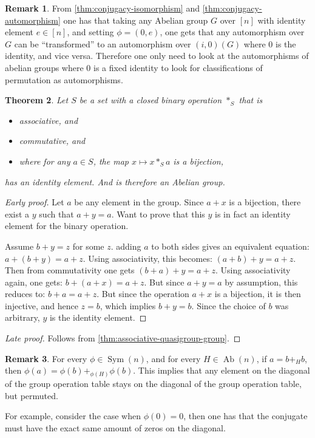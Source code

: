 \documentclass[a4paper, 12pt, english]{article}
\theoremstyle{plain}
\newtheorem{theorem}{Theorem}[section]
\theoremstyle{definition}
\newtheorem{remark}[theorem]{Remark}
\DeclareMathOperator{\Ab}{Ab}
\DeclareMathOperator{\Sym}{Sym}
\begin{document}
\begin{remark}
    From \autoref{thm:conjugacy-isomorphism} and \autoref{thm:conjugacy-automorphism} one has that taking any Abelian group \( G \) over \( [n] \) with identity element \( e \in [n] \), and setting \( \phi = (0, e) \), one gets that any automorphism over \( G \) can be ``transformed'' to an automorphism over \( (i, 0)(G) \) where \( 0 \) is the identity, and vice versa. Therefore one only need to look at the automorphisms of abelian groups where \( 0 \) is a fixed identity to look for classifications of permutation as automorphisms.
\end{remark}

\begin{theorem}
    Let \( S \) be a set with a closed binary operation \( *_S \) that is
    \begin{itemize}
        \item associative, and
        \item commutative, and
        \item where for any \( a \in S \), the map \( x \mapsto x *_S a \) is a bijection,
    \end{itemize}
    has an identity element. And is therefore an Abelian group.
\end{theorem}
\begin{proof}[Early proof]
    Let \( a \) be any element in the group. Since \( a + x \) is a bijection, there exist a \( y \) such that \( a + y = a \). Want to prove that this \( y \) is in fact an identity element for the binary operation.

    Assume \( b + y = z\) for some \( z \). adding \( a \) to both sides gives an equivalent equation: \( a + (b + y) = a + z \). Using associativity, this becomes: \( (a + b) + y = a + z \). Then from commutativity one gets \( (b + a) + y = a + z \). Using associativity again, one gets: \( b + (a + x) = a + z\). But since \( a + y = a \) by assumption, this reduces to: \( b + a = a + z \). But since the operation \( a + x\) is a bijection, it is then injective, and hence \( z = b \), which implies \( b + y = b\). Since the choice of \( b \) was arbitrary, \( y \) is the identity element.
\end{proof}
\begin{proof}[Late proof]
    Follows from \autoref{thm:associative-quasigroup-group}.
\end{proof}

\begin{remark}
    For every \( \phi \in \Sym(n) \), and for every \( H \in \Ab(n) \), if \( a = b +_H b \), then \( \phi(a) = \phi(b) +_{\phi(H)} \phi(b) \). This implies that any element on the diagonal of the group operation table stays on the diagonal of the group operation table, but permuted.

    For example, consider the case when \( \phi(0) = 0 \), then one has that the conjugate must have the exact same amount of zeros on the diagonal.
\end{remark}
\end{document}
